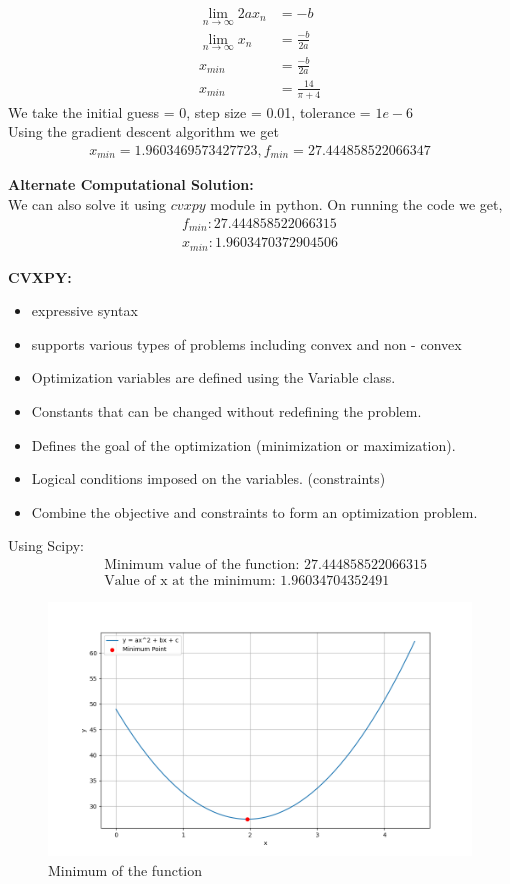 \documentclass[journal]{IEEEtran}
\numberwithin{equation}{enumi}
\numberwithin{figure}{enumi}
\begin{document}
\begin{itemize}
\begin{align}
        \lim_{n \to \infty}{2ax_n} &= -b\\
        \lim_{n \to \infty}{x_n} &= \frac{-b}{2a}\\
        x_{min} &= \frac{-b}{2a}\\
        x_{min} &= \frac{14}{\pi + 4}
    \end{align}
    We take the initial guess = 0, step size = 0.01, tolerance = $1e - 6$\\
    Using the gradient descent algorithm we get
    \begin{align}
        x_{min} = 1.9603469573427723, f_{min} = 27.444858522066347
    \end{align}
\end{itemize}

\textbf{Alternate Computational Solution: }\\

We can also solve it using $cvxpy$ module in python. On running the code we get,
\begin{align}
    f_{min}: 27.444858522066315\\
    x_{min}: 1.9603470372904506
\end{align}

\textbf{CVXPY:}
\begin{itemize}
    \item expressive syntax
    \item supports various types of problems including convex and non - convex 
    \item Optimization variables are defined using the Variable class.
    \item Constants that can be changed without redefining the problem.
    \item Defines the goal of the optimization (minimization or maximization).
    \item Logical conditions imposed on the variables. (constraints)
    \item Combine the objective and constraints to form an optimization problem.
\end{itemize}

Using Scipy:\\
\begin{align}
    &\text{Minimum value of the function: }27.444858522066315\\
    &\text{Value of x at the minimum: }1.96034704352491
\end{align}

\begin{figure}[ht]
   \centering
   \includegraphics[width=1\columnwidth]{figs/fig.png}
   \caption{Minimum of the function}
\end{figure}
\end{document}
